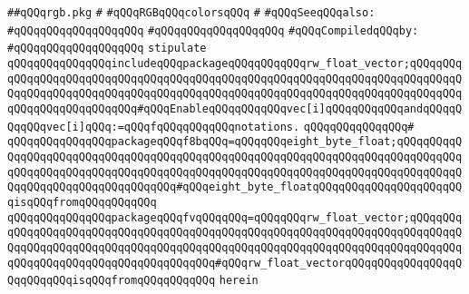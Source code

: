 \label{src/lib/x-kit/xclient/src/color/rgb.pkg}
\verb|##qQQqrgb.pkg|\newline
\verb|#|\newline
\verb|#qQQqRGBqQQqcolorsqQQq|\newline
\verb|#|\newline
\verb|#qQQqSeeqQQqalso:|\newline
\verb|#qQQqqQQqqQQqqQQqqQQq|\newline
\verb|#qQQqqQQqqQQqqQQqqQQq|\newline
\newline
\verb|#qQQqCompiledqQQqby:|\newline
\verb|#qQQqqQQqqQQqqQQqqQQq|\newline
\newline
\verb|stipulate|\newline
\verb|qQQqqQQqqQQqqQQqincludeqQQqpackageqQQqqQQqqQQqrw_float_vector;qQQqqQQqqQQqqQQqqQQqqQQqqQQqqQQqqQQqqQQqqQQqqQQqqQQqqQQqqQQqqQQqqQQqqQQqqQQqqQQqqQQqqQQqqQQqqQQqqQQqqQQqqQQqqQQqqQQqqQQqqQQqqQQqqQQqqQQqqQQqqQQqqQQqqQQqqQQqqQQqqQQqqQQq#qQQqEnableqQQqqQQqqQQqvec[i]qQQqqQQqqQQqandqQQqqQQqqQQqvec[i]qQQq:=qQQqfqQQqqQQqqQQqnotations.|\newline
\verb|qQQqqQQqqQQqqQQq#|\newline
\verb|qQQqqQQqqQQqqQQqpackageqQQqf8bqQQq=qQQqqQQqeight_byte_float;qQQqqQQqqQQqqQQqqQQqqQQqqQQqqQQqqQQqqQQqqQQqqQQqqQQqqQQqqQQqqQQqqQQqqQQqqQQqqQQqqQQqqQQqqQQqqQQqqQQqqQQqqQQqqQQqqQQqqQQqqQQqqQQqqQQqqQQqqQQqqQQqqQQqqQQqqQQqqQQqqQQqqQQqqQQqqQQq#qQQqeight_byte_floatqQQqqQQqqQQqqQQqqQQqqQQqisqQQqfromqQQqqQQqqQQq|\newline
\verb|qQQqqQQqqQQqqQQqpackageqQQqfvqQQqqQQq=qQQqqQQqrw_float_vector;qQQqqQQqqQQqqQQqqQQqqQQqqQQqqQQqqQQqqQQqqQQqqQQqqQQqqQQqqQQqqQQqqQQqqQQqqQQqqQQqqQQqqQQqqQQqqQQqqQQqqQQqqQQqqQQqqQQqqQQqqQQqqQQqqQQqqQQqqQQqqQQqqQQqqQQqqQQqqQQqqQQqqQQqqQQqqQQqqQQq#qQQqrw_float_vectorqQQqqQQqqQQqqQQqqQQqqQQqqQQqisqQQqfromqQQqqQQqqQQq|\newline
\verb|herein|\newline
